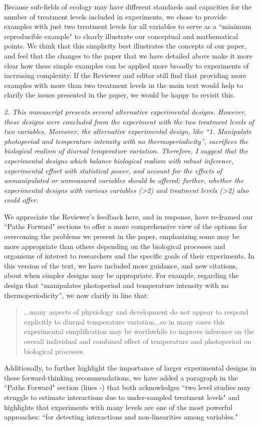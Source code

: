 \documentclass[11pt]{article}
\begin{document}
Because sub-fields of ecology may have different standards and capacities for the number of treatment levels included in experiments, we chose to provide examples with just two treatment levels for all variables to serve as a ``minimum reproducible example" to clearly illustrate our conceptual and mathematical points. We think that this simplicity best illustrates the concepts of our paper, and feel that the changes to the paper that we have detailed above make it more clear how these simple examples can be applied more broadly to experiments of increasing complexity. If the Reviewer and editor still find that providing more examples with more than two treatment levels in the main text would help to clarify the issues presented in the paper, we would be happy to revisit this.

\emph{2. This manuscript presents several alternative experimental designs. However, these designs were concluded from the experiment with the two treatment levels of two variables. Moreover, the alternative experimental design, like “1. Manipulate photoperiod and temperature intensity with no thermoperiodicity”, sacrifices the biological realism of diurnal temperature variation. Therefore, I suggest that the experimental designs which balance biological realism with robust inference, experimental effort with statistical power, and account for the effects of unmanipulated or unmeasured variables should be offered; further, whether the experimental designs with various variables (>2) and treatment levels (>2) also could offer.}

We appreciate the Reviewer's feedback here, and in response, have re-framed our ``Paths Forward" sections to offer a more comprehensive view of the options for overcoming the problems we present in the paper, emphasizing some may be more appropriate than others depending on the biological processes and organisms of interest to researchers and the specific goals of their experiments. In this version of the text, we have included more guidance, and new citations, about when simpler designs may be appropriate.
For example, regarding the design that ``manipulates photoperiod and temperature intensity with no thermoperiodicity”, we now clarify in line  that:
\begin{quote}...many aspects of physiology and development do not appear to respond explicitly to diurnal temperature variation...so in many cases this experimental simplification may be worthwhile to improve inference on the overall individual and combined effect of temperature and photoperiod on biological processes.\end{quote}
Additionally, to further highlight the importance of larger experimental designs in these forward-thinking recommendations, we have added a paragraph in the ``Paths Forward" section (lines -) that both acknowledges
``two level studies may struggle to estimate interactions due to under-sampled treatment levels" and highlights that experiments with many levels are one of the most powerful approaches: ``for detecting interactions and non-linearities among variables."
\end{document}
